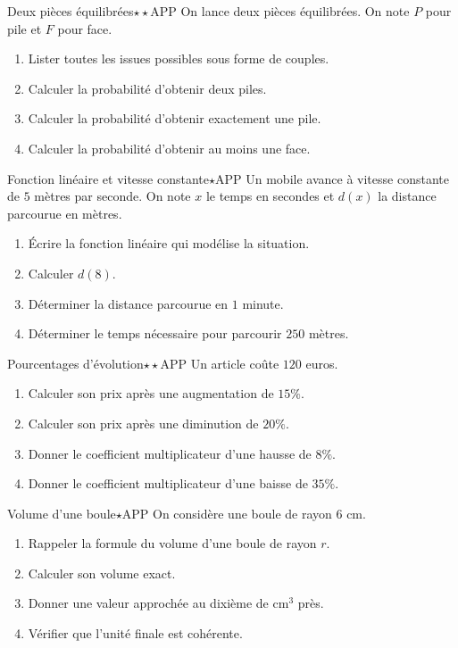 \documentclass[11pt,a4paper]{article}
\newcounter{exo}
\begin{document}
\begin{exobox}{Deux pièces équilibrées}{$\star\star$}{APP}
On lance deux pièces équilibrées. On note $P$ pour pile et $F$ pour face.
\begin{enumerate}
\item Lister toutes les issues possibles sous forme de couples.
\item Calculer la probabilité d'obtenir deux piles.
\item Calculer la probabilité d'obtenir exactement une pile.
\item Calculer la probabilité d'obtenir au moins une face.
\end{enumerate}
\end{exobox}

\begin{exobox}{Fonction linéaire et vitesse constante}{$\star$}{APP}
Un mobile avance à vitesse constante de $5$ mètres par seconde. On note $x$ le temps en secondes et $d(x)$ la distance parcourue en mètres.
\begin{enumerate}
\item Écrire la fonction linéaire qui modélise la situation.
\item Calculer $d(8)$.
\item Déterminer la distance parcourue en $1$ minute.
\item Déterminer le temps nécessaire pour parcourir $250$ mètres.
\end{enumerate}
\end{exobox}

\begin{exobox}{Pourcentages d'évolution}{$\star\star$}{APP}
Un article coûte $120$ euros.
\begin{enumerate}
\item Calculer son prix après une augmentation de $15\%$.
\item Calculer son prix après une diminution de $20\%$.
\item Donner le coefficient multiplicateur d'une hausse de $8\%$.
\item Donner le coefficient multiplicateur d'une baisse de $35\%$.
\end{enumerate}
\end{exobox}

\begin{exobox}{Volume d'une boule}{$\star$}{APP}
On considère une boule de rayon $6$ cm.
\begin{enumerate}
\item Rappeler la formule du volume d'une boule de rayon $r$.
\item Calculer son volume exact.
\item Donner une valeur approchée au dixième de cm$^3$ près.
\item Vérifier que l'unité finale est cohérente.
\end{enumerate}
\end{exobox}
\end{document}
